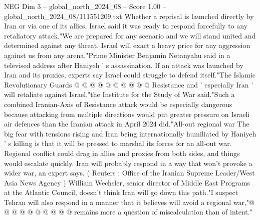 \begin{textsample}{NEG Dim 3 – global\_north\_2024\_08 – Score 1.00 – global\_north\_2024\_08/111551209.txt}
Whether a reprisal is launched directly by Iran or via one of its allies, Israel said it was ready to respond forcefully to any retaliatory attack."We are prepared for any scenario and we will stand united and determined against any threat.
Israel will exact a heavy price for any aggression against us from any arena,"Prime Minister Benjamin Netanyahu said in a televised address after Haniyeh ' s assassination.
If an attack was launched by Iran and its proxies, experts say Israel could struggle to defend itself."The Islamic Revolutionary Guards @ @ @ @ @ @ @ @ @ @ Resistance and ' especially Iran ' will retaliate against Israel,"the Institute for the Study of War said."Such a combined Iranian-Axis of Resistance attack would be especially dangerous because attacking from multiple directions would put greater pressure on Israeli air defences than the Iranian attack in April 2024 did."All-out regional war The big fear with tensions rising and Iran being internationally humiliated by Haniyeh ' s killing is that it will be pressed to marshal its forces for an all-out war.
Regional conflict could drag in allies and proxies from both sides, and things would escalate quickly.
Iran will probably respond in a way that won't provoke a wider war, an expert says. ( Reuters : Office of the Iranian Supreme Leader/West Asia News Agency ) William Wechsler, senior director of Middle East Programs at the Atlantic Council, doesn't think Iran will go down this path."I suspect Tehran will also respond in a manner that it believes will avoid a regional war,"@ @ @ @ @ @ @ @ @ @ remains more a question of miscalculation than of intent."

\end{textsample}
